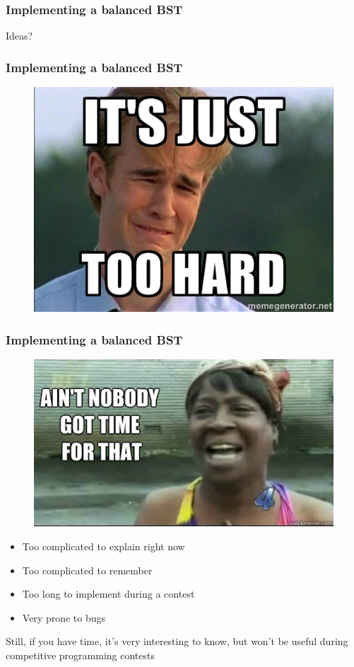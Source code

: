 \begin{frame}
	\frametitle{Implementing a balanced BST}
	Ideas?
\end{frame}

\begin{frame}
	\frametitle{Implementing a balanced BST}
	\begin{figure}
		\centering
		\includegraphics[width=0.7\linewidth]{toohard}
	\end{figure}
\end{frame}

\begin{frame}
	\frametitle{Implementing a balanced BST}
	\begin{figure}
		\centering
		\includegraphics[width=0.7\linewidth]{time}
	\end{figure}
	
	\begin{itemize}
		\pause\item Too complicated to explain right now
		\pause\item Too complicated to remember
		\pause\item Too long to implement during a contest
		\pause\item Very prone to bugs
	\end{itemize}
	Still, if you have time, it's very interesting to know, but won't be useful during competitive programming contests
\end{frame}

